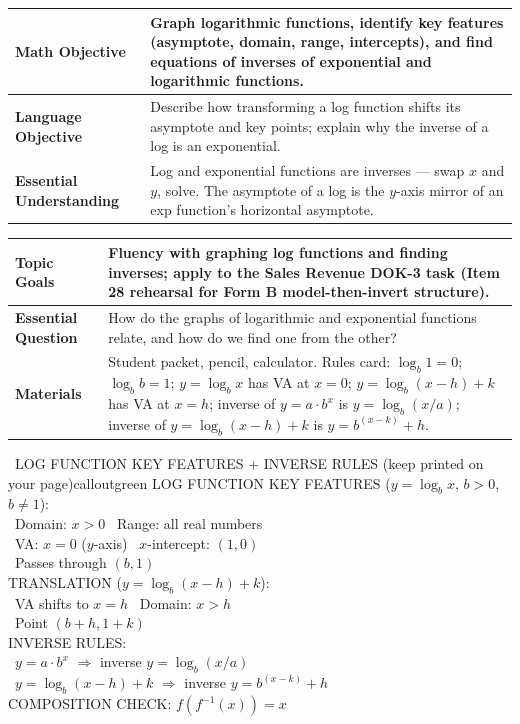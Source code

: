 \documentclass[11pt]{article}
\newcommand{\lessonrow}[2]{\textbf{#1} & #2 \\ \hline}
\begin{document}

{\small
\renewcommand{\arraystretch}{1.25}
\noindent\begin{tabular}{|p{1.8in}|p{4.8in}|}
\hline
\lessonrow{Math Objective}{Graph logarithmic functions, identify key features (asymptote, domain, range, intercepts), and find equations of inverses of exponential and logarithmic functions.}
\lessonrow{Language Objective}{Describe how transforming a log function shifts its asymptote and key points; explain why the inverse of a log is an exponential.}
\lessonrow{Essential Understanding}{Log and exponential functions are inverses --- swap \(x\) and \(y\), solve. The asymptote of a log is the \(y\)-axis mirror of an exp function's horizontal asymptote.}
\end{tabular}
}

{\small
\renewcommand{\arraystretch}{1.25}
\noindent\begin{tabular}{|p{1.8in}|p{4.8in}|}
\hline
\lessonrow{Topic Goals}{Fluency with graphing log functions and finding inverses; apply to the Sales Revenue DOK-3 task (Item 28 rehearsal for Form B model-then-invert structure).}
\lessonrow{Essential Question}{How do the graphs of logarithmic and exponential functions relate, and how do we find one from the other?}
\lessonrow{Materials}{Student packet, pencil, calculator. Rules card: \(\log_b 1 = 0\); \(\log_b b = 1\); \(y = \log_b x\) has VA at \(x = 0\); \(y = \log_b(x-h) + k\) has VA at \(x = h\); inverse of \(y = a\cdot b^x\) is \(y = \log_b(x/a)\); inverse of \(y = \log_b(x-h) + k\) is \(y = b^{(x-k)} + h\).}
\end{tabular}
}


\begin{callout}{\IconBook\ LOG FUNCTION KEY FEATURES + INVERSE RULES (keep printed on your page)}{calloutgreen}
LOG FUNCTION KEY FEATURES (\(y = \log_b x\), \(b > 0\), \(b \neq 1\)):\\
\textbullet\ Domain: \(x > 0\) \hfill \textbullet\ Range: all real numbers\\
\textbullet\ VA: \(x = 0\) (\(y\)-axis) \hfill \textbullet\ \(x\)-intercept: \((1, 0)\)\\
\textbullet\ Passes through \((b, 1)\)\\
TRANSLATION (\(y = \log_b(x-h) + k\)):\\
\textbullet\ VA shifts to \(x = h\) \hfill \textbullet\ Domain: \(x > h\)\\
\textbullet\ Point \((b + h, 1 + k)\)\\
INVERSE RULES:\\
\textbullet\ \(y = a\cdot b^x\) \(\Rightarrow\) inverse \(y = \log_b(x/a)\)\\
\textbullet\ \(y = \log_b(x-h) + k\) \(\Rightarrow\) inverse \(y = b^{(x-k)} + h\)\\
COMPOSITION CHECK: \(f(f^{-1}(x)) = x\)
\end{callout}
\end{document}
